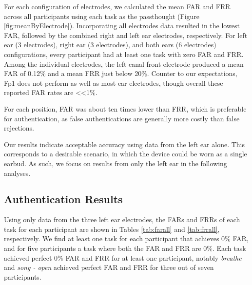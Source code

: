 \documentclass[a4paper,twoside]{article}
\begin{document}
\noindent For each configuration of electrodes, we calculated the mean FAR and FRR across all participants using each task as the passthought (Figure \ref{fig:meanByElectrode}). Incorporating all electrodes data resulted in the lowest FAR, followed by the combined right and left ear electrodes, respectively. For left ear (3 electrodes), right ear (3 electrodes), and both ears (6 electrodes) configurations, every participant had at least one task with zero FAR and FRR. Among the individual electrodes, the left canal front electrode produced a mean FAR of 0.12\% and a mean FRR just below 20\%. Counter to our expectations, Fp1 does not perform as well as most ear electrodes, though overall these reported FAR rates are \textless\textless 1\%. 

For each position, FAR was about ten times lower than FRR, which is preferable for authentication, as false authentications are generally more costly than false rejections.

Our results indicate acceptable accuracy using data from the left ear alone. This corresponds to a desirable scenario, in which the device could be worn as a single earbud. As such, we focus on results from only the left ear in the following analyses.

\subsection{Authentication Results}

\noindent Using only data from the three left ear electrodes, the FARs and FRRs of each task for each participant are shown in Tables \ref{tab:farall} and \ref{tab:frrall}, respectively. We find at least one task for each participant that achieves 0\% FAR, and for five participants a task where both the FAR and FRR are 0\%. Each task achieved perfect 0\% FAR and FRR for at least one participant, notably \textit{breathe} and \textit{song - open} achieved perfect FAR and FRR for three out of seven participants.
\end{document}
